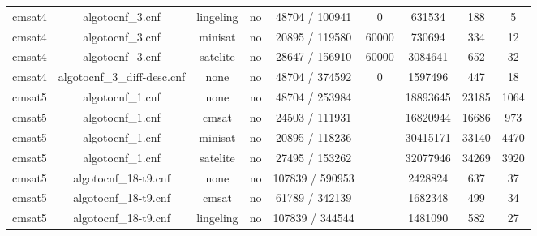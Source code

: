 \begin{appendices}
\begin{table}[p]
\begin{center}
\begin{tabular}{l|cccccccc}
  cmsat4                         & algotocnf\_3.cnf               & lingeling  & no    & 48704 / 100941 & 0         & 631534    & 188        & 5 \\ %
  cmsat4                         & algotocnf\_3.cnf               & minisat    & no    & 20895 / 119580 & 60000     & 730694    & 334        & 12 \\ %
  cmsat4                         & algotocnf\_3.cnf               & satelite   & no    & 28647 / 156910 & 60000     & 3084641   & 652        & 32 \\ %
  cmsat4                         & algotocnf\_3\_diff-desc.cnf    & none       & no    & 48704 / 374592 & 0         & 1597496   & 447        & 18 \\ %
  cmsat5                         & algotocnf\_1.cnf               & none       & no    & 48704 / 253984 &           & 18893645  & 23185      & 1064 \\ %
  cmsat5                         & algotocnf\_1.cnf               & cmsat      & no    & 24503 / 111931 &           & 16820944  & 16686      & 973 \\ %
  cmsat5                         & algotocnf\_1.cnf               & minisat    & no    & 20895 / 118236 &           & 30415171  & 33140      & 4470 \\ %
  cmsat5                         & algotocnf\_1.cnf               & satelite   & no    & 27495 / 153262 &           & 32077946  & 34269      & 3920 \\ %
  cmsat5                         & algotocnf\_18-t9.cnf           & none       & no    & 107839 / 590953 &           & 2428824   & 637        & 37 \\ %
  cmsat5                         & algotocnf\_18-t9.cnf           & cmsat      & no    & 61789 / 342139 &           & 1682348   & 499        & 34 \\ %
  cmsat5                         & algotocnf\_18-t9.cnf           & lingeling  & no    & 107839 / 344544 &           & 1481090   & 582        & 27 \\ %

\end{tabular}
\end{center}
\end{table}
\end{appendices}
